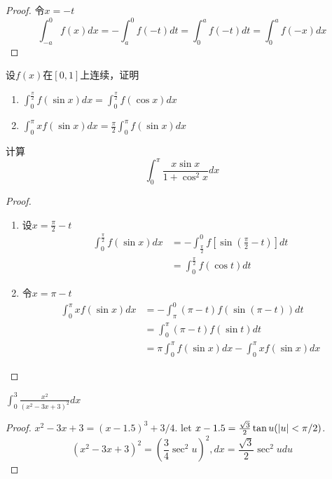 \documentclass[11pt]{article}
\begin{document}
\begin{proof}
令\(x=-t\)
\begin{equation*}
\int_{-a}^0f(x)dx=-\int_{a}^0f(-t)dt=\int_0^af(-t)dt=\int_0^af(-x)dx
\end{equation*}
\end{proof}

\begin{proposition}[]
设\(f(x)\)在\([0,1]\)上连续，证明
\begin{enumerate}
\item \(\int_0^{\frac{\pi}{2}}f(\sin x)dx=\int_0^{\frac{\pi}{2}}f(\cos x)dx\)
\item \(\int_0^\pi xf(\sin x)dx=\frac{\pi}{2}\int_0^\pi f(\sin x)dx\)
\end{enumerate}


计算
\begin{equation*}
\int_0^\pi\frac{x\sin x}{1+\cos^2x}dx
\end{equation*}
\end{proposition}

\begin{proof}
\begin{enumerate}
\item 设\(x=\frac{\pi}{2}-t\)
\begin{align*}
\int_0^{\frac{\pi}{2}}f(\sin x)dx&=-\int_{\frac{\pi}{2}}^0f[\sin(\frac{\pi}{2}-t)]dt\\
&=\int_0^{\frac{\pi}{2}}f(\cos t)dt
\end{align*}
\item 令\(x=\pi-t\)
\begin{align*}
\int_0^\pi xf(\sin x)dx&=-\int_\pi^0(\pi-t)f(\sin(\pi-t))dt\\
&=\int_0^\pi(\pi-t)f(\sin t)dt\\
&=\pi\int_0^\pi f(\sin x)dx-\int_0^\pi xf(\sin x)dx
\end{align*}
\end{enumerate}
\end{proof}

\begin{proposition}[]
\(\int_0^3\frac{x^2}{(x^2-3x+3)^2}dx\)
\end{proposition}

\begin{proof}
\(x^2-3x+3=(x-1.5)^3+3/4\). let \(x-1.5=\frac{\sqrt{3}}{2}\tan
   u(\abs{u}<\pi/2)\).
\begin{equation*}
(x^2-3x+3)^2=(\frac{3}{4}\sec^2u)^2,dx=\frac{\sqrt{3}}{2}\sec^2udu
\end{equation*}
\end{proof}
\end{document}
